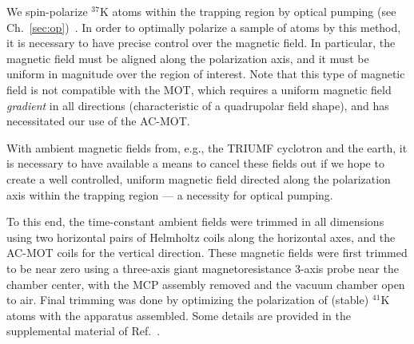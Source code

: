 We spin-polarize $^{37}\textrm{K}$ atoms within the trapping region by optical pumping (see Ch.~\ref{sec:op})~\cite{ben_OP}.  In order to optimally polarize a sample of atoms by this method, it is necessary to have precise control over the magnetic field.  
In particular, the magnetic field must be aligned along the polarization axis, 
and it must be uniform in magnitude over the region of interest.  
Note that this type of magnetic field is not compatible with the MOT, which requires a uniform magnetic field \emph{gradient} in all directions (characteristic of a quadrupolar field shape), and has necessitated our use of the AC-MOT.




\FloatBarrier
\label{sec:trimming}
With ambient magnetic fields from, e.g., the TRIUMF cyclotron and the earth, it is necessary to have available a means to cancel these fields out if we hope to create a well controlled, uniform magnetic field directed along the polarization axis within the trapping region --- a necessity for optical pumping.  

To this end, the time-constant ambient fields were trimmed in all dimensions using two horizontal pairs of Helmholtz coils along the horizontal axes, and the AC-MOT coils for the vertical direction.
These magnetic fields were first trimmed to be near zero using a three-axis giant magnetoresistance 3-axis probe near the chamber center, with the \ac{MCP} assembly removed and the vacuum chamber open to air.
%
Final trimming was done by optimizing the polarization of (stable) $^{41}$K atoms with the apparatus assembled.  Some details are provided in the supplemental material of Ref.~\cite{ben_Abeta}. 


